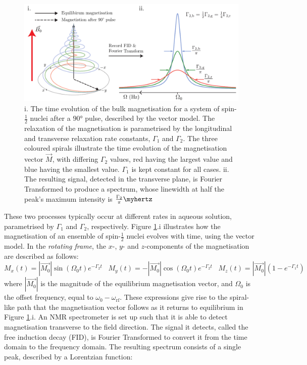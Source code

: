 \begin{figure}
\centering
\includegraphics[scale=0.75]{./Figures/SimonsFigs/relaxation.pdf}
\caption{i. The time evolution of the bulk magnetisation for a system of spin-$\frac{1}{2}$ nuclei after a $\ang{90}$ pulse, described by the vector model. The relaxation of the magnetisation is parametrised by the longitudinal and transverse relaxation rate constants, $\Gamma_1$ and $\Gamma_2$. The three coloured spirals illustrate the time evolution of the magnetisation vector $\vec{M}$, with differing $\Gamma_2$ values, red having the largest value and blue having the smallest value. $\Gamma_1$ is kept constant for all cases. ii. The resulting signal, detected in the transverse plane, is Fourier Transformed to produce a spectrum, whose linewidth at half the peak's maximum intensity is $\frac{\Gamma_2}{\pi} \si{\myhertz}$}
\label{VecMod}
\end{figure}
These two processes typically occur at different rates in aqueous solution, parametrised by $\Gamma_1$ and $\Gamma_2$, respectively. Figure \ref{VecMod}.i illustrates how the magnetisation of an ensemble of spin-$\frac{1}{2}$ nuclei evolves with time, using the vector model. In the \textit{rotating frame}\cite{RN6}, the $x$-, $y$- and $z$-components of the magnetisation are described as follows:
\begin{equation}
M_x(t) = |\vec{M_0}| \sin(\Omega_0 t) e^{-\Gamma_2 t} \hspace{10pt} M_y(t) = -|\vec{M_0}| \cos(\Omega_0 t) e^{-\Gamma_2 t} \hspace{10pt} M_z(t) = |\vec{M_0}|\left(1 - e^{-\Gamma_1 t}\right)
\end{equation}
where $|\vec{M_0}|$ is the magnitude of the equilibrium magnetisation vector, and $\Omega_0$ is the offset frequency, equal to $\omega_0 - \omega_{\text{rf}}$. These expressions give rise to the spiral-like path that the magnetisation vector follows as it returns to equilibrium in Figure \ref{VecMod}.i. An NMR spectrometer is set up such that it is able to detect magnetisation transverse to the field direction. The signal it detects, called the free induction decay (FID), is Fourier Transformed to convert it from the time domain to the frequency domain. The resulting spectrum consists of a single peak, described by a Lorentzian function:
